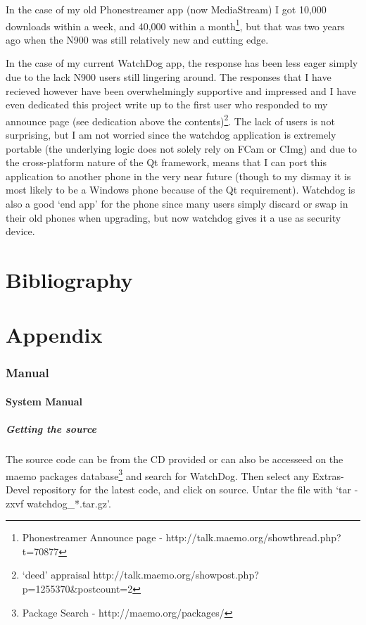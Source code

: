 \documentclass[11pt]{article} %
\begin{document}
In the case of my old Phonestreamer app (now MediaStream) I got 10,000 downloads within a week, and 40,000 within a month\footnote{Phonestreamer Announce page - http://talk.maemo.org/showthread.php?t=70877}, but that was two years ago when the N900 was still relatively new and cutting edge.

In the case of my current WatchDog app, the response has been less eager simply due to the lack N900 users still lingering around. The responses that I have recieved however have been overwhelmingly supportive and impressed and I have even dedicated this project write up to the first user who responded to my announce page (see dedication above the contents)\footnote{‘deed’ appraisal http://talk.maemo.org/showpost.php?p=1255370\&postcount=2}. The lack of users is not surprising, but I am not worried since the watchdog application is extremely portable (the underlying logic does not solely rely on FCam or CImg) and due to the cross-platform nature of the Qt framework, means that I can port this application to another phone in the very near future (though to my dismay it is most likely to be a Windows phone because of the Qt requirement). Watchdog is also a good ‘end app’ for the phone since many users simply discard or swap in their old phones when upgrading, but now watchdog gives it a use as security device.

\part{Bibliography}

\part{Appendix}
\section{Manual}
\subsection{System Manual}
\subsubsection{Getting the source}
The source code can be from the CD provided or can also be accesseed on the maemo packages database\footnote{Package Search - http://maemo.org/packages/} and search for WatchDog. Then select any Extras-Devel repository for the latest code, and click on source. Untar the file with ‘tar -zxvf  watchdog_*.tar.gz’.
\end{document}
